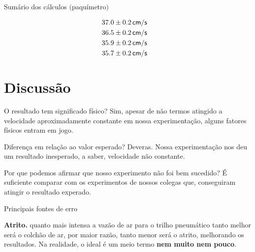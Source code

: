 \documentclass[
  leqno,
  aspectratio=169
]{beamer}
\begin{document}
  \begin{frame}{Sum\'ario dos c\'alculos $($paqu\'imetro$)$}
    \centering                               
    \begin{table}                            
      \begin{alignat*}{2}                    
        37.0 & \pm 0.2\, \hbox{\sffamily cm/s}\cr
        36.5 & \pm 0.2\, \hbox{\sffamily cm/s}\cr
        35.9 & \pm 0.2\, \hbox{\sffamily cm/s}\cr
        35.7 & \pm 0.2\, \hbox{\sffamily cm/s}\cr
      \end{alignat*}
      \caption{velocidade m\'edia com suas respectivas incertezas.}
    \end{table}
  \end{frame}

  \section{Discuss\~ao}
  \begin{frame}{O resultado tem significado f\'isico?}
    Sim, apesar de n\~ao termos atingido a velocidade aproximadamente constante em nossa experimenta\c c\~ao, alguns fatores f\'isicos entram em jogo.
  \end{frame}

  \begin{frame}{Diferen\c ca em rela\c c\~ao ao valor esperado?}
    Deveras. Nossa experimenta\c c\~ao nos deu um resultado inesperado, a saber, velocidade n\~ao constante. 
  \end{frame}

  \begin{frame}{Por que podemos afirmar que nosso experimento n\~ao foi bem sucedido?}
    \'E suficiente comparar com os experimentos de nossos colegas que, conseguiram atingir o resultado experado.
  \end{frame}


  \begin{frame}{Principais fontes de erro}

    {\bf Atrito.} quanto mais intensa a vaz\~ao de ar para o trilho pneum\'atico tanto melhor ser\'a o colch\~ao de ar, por maior raz\~ao, tanto menor ser\'a o atrito, melhorando os resultados. Na realidade, o ideal \'e um meio termo {\bf nem muito nem pouco}.
  \end{frame}
\end{document}
